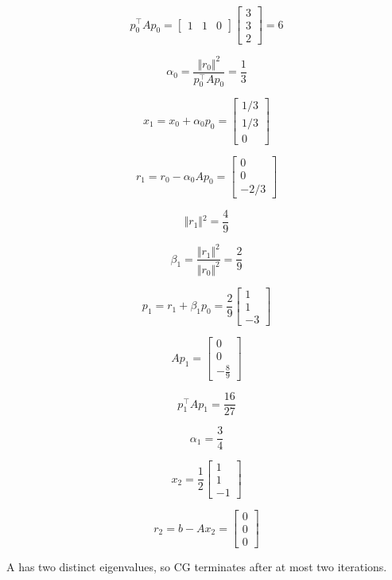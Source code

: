 \documentclass[11pt,a4paper]{article}
\begin{document}
\begin{enumerate}
    $$
    p_0^\top A p_0
    = 
    \begin{bmatrix}
        1 & 1 & 0
    \end{bmatrix}
    \begin{bmatrix}
        3 \\
        3 \\
        2
    \end{bmatrix}
    = 6
    $$

    $$
    \alpha_0
    = \frac{\Vert  r_0 \Vert ^2}{p_0^\top A p_0} 
    = \frac{1}{3}
    $$

    $$
    x_1
    = x_0 + \alpha_0 p_0
    = \begin{bmatrix}
        1/3 \\
        1/3 \\
        0
    \end{bmatrix}
    $$

    $$
    r_1
    = r_0 - \alpha_0 A p_0
    = \begin{bmatrix}
        0 \\
        0 \\
        -2/3
    \end{bmatrix}
    $$

    $$
    \Vert{} r_1 \Vert{}^2 = \frac{4}{9}
    $$

    $$
    \beta_1
    = \frac{\Vert r_1 \Vert ^2}{\Vert r_0 \Vert ^2}
    = \frac{2}{9}
    $$

    $$
    p_1
    = r_1 + \beta_1 p_0
    = \frac{2}{9}\begin{bmatrix} 1 \\ 1 \\ -3 \end{bmatrix}
    $$

    $$
    A p_1
    =
    \begin{bmatrix}
        0 \\
        0 \\
        - \frac{8}{9}
    \end{bmatrix}
    $$

    $$
    p_1^\top A p_1
    = \frac{16}{27}
    $$
    
    $$
    \alpha_1 = \frac{3}{4}
    $$

    $$
    x_2 = \frac{1}{2} \begin{bmatrix} 1 \\ 1 \\ -1 \end{bmatrix}
    $$

    $$
    r_2 = b - A x_2
    = \begin{bmatrix} 0 \\ 0 \\ 0 \end{bmatrix}
    $$

    A has two distinct eigenvalues, so CG terminates after at most two iterations.
\end{enumerate}
\end{document}
